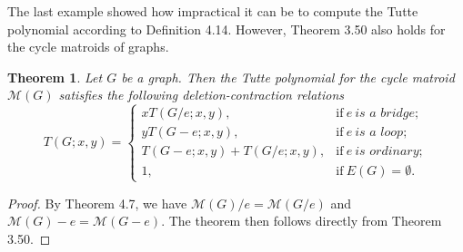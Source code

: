 \documentclass[12pt,a4paper, twoside, autooneside=false]{scrartcl}
\newtheorem{theorem}{Theorem}[section]
\theoremstyle{definition}
\theoremstyle{remark}
\numberwithin{equation}{section}
\newcommand{\M}{\mathcal{M}} %
\begin{document}
The last example showed how impractical it can be to compute the Tutte polynomial according to Definition 4.14. However, Theorem 3.50 also holds for the cycle matroids of graphs.
\begin{theorem}
Let $G$ be a graph. Then the Tutte polynomial for the cycle matroid $\M(G)$ satisfies the following deletion-contraction relations
\[
T(G; x,y) = \begin{cases}
x T(G/e;x,y), & \text{if} \ e \ \textit{is a bridge}; \\
y T(G - e;x,y), & \text{if} \ e \ \textit{is a loop}; \\
T(G - e;x,y) + T(G / e; x,y), & \text{if} \ e \ \textit{is ordinary}; \\ 
1, & \text{if} \ E(G) = \emptyset. 
\end{cases}
\]
\end{theorem}
\begin{proof}
By Theorem 4.7, we have $\M(G)/e = \M(G/e)$ and $\M(G) - e = \M(G - e)$. The theorem then follows directly from Theorem 3.50.
\end{proof}
\end{document}
